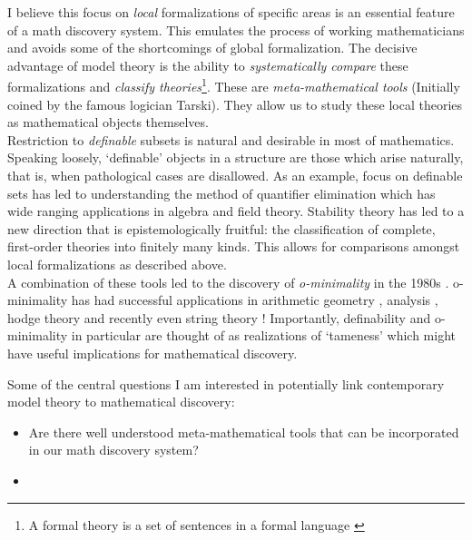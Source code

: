 I believe this focus on \textit{local} formalizations of specific areas is an essential feature of a math discovery system. This emulates the process of working mathematicians and avoids some of the shortcomings of global formalization. The decisive advantage of model theory is the ability to \textit{systematically compare} these formalizations and \textit{classify theories}\footnote[3]{A formal theory is a set of sentences in a formal language \cite{changModelTheory1990}}.
These are \textit{meta-mathematical tools} (Initially coined by the famous logician Tarski). They allow us to study these local theories as mathematical objects themselves. \\
Restriction to \textit{definable} subsets is natural and desirable in most of mathematics. Speaking loosely, `definable' objects in a structure are those which arise naturally, that is, when pathological cases are disallowed. As an example, focus on definable sets has led to understanding the method of quantifier elimination \cite{robinsonApplicationSymbolicLogic1952,TarskiDecisionMethod} which has wide ranging applications in algebra and field theory.
Stability theory has led to a  new direction that is epistemologically fruitful: the classification of complete, first-order theories into finitely many kinds. This allows for comparisons amongst local formalizations as described above.\\
A combination of these tools led to the discovery of \textit{o-minimality} in the 1980s \cite{pillayDefinableSetsOrdered1986, DENDRIES198497}. o-minimality has had successful applications in arithmetic geometry \cite{binyaminiWilkiesConjecturePfaffian2022,binyaminiBoundsRationalPoints2023}, analysis \cite{pilaOminimalityAndreOortConjecture2011}, hodge theory and recently even string theory \cite{douglasTamenessQuantumField2022,grimmComplexityTameQuantum2023,grimmFinitenessTheoremsCounting2023,grimmTamenessStringsDistance2022}!
Importantly, definability and o-minimality in particular are thought of as realizations of `tameness' \cite{acampoGrothendieckTameTopology2016, piekoszTameTopology2023} which might have useful implications for mathematical discovery.
\par
Some of the central questions I am interested in potentially link contemporary model theory to mathematical discovery:
\begin{itemize}
    \item Are there well understood meta-mathematical tools that can be incorporated in our math discovery system?
    \item 
\end{itemize}


